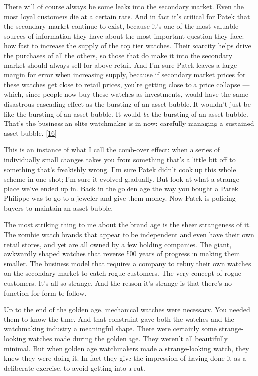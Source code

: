 There will of course always be some leaks into the secondary market.
Even the most loyal customers die at a certain rate. And in fact it's
critical for Patek that the secondary market continue to exist, because
it's one of the most valuable sources of information they have about the
most important question they face: how fast to increase the supply of
the top tier watches. Their scarcity helps drive the purchases of all
the others, so those that do make it into the secondary market should
always sell for above retail. And I'm sure Patek leaves a large margin
for error when increasing supply, because if secondary market prices for
these watches get close to retail prices, you're getting close to a
price collapse --- which, since people now buy these watches as
investments, would have the same disastrous cascading effect as the
bursting of an asset bubble. It wouldn't just be like the bursting of an
asset bubble. It would \emph{be} the bursting of an asset bubble. That's
the business an elite watchmaker is in now: carefully managing a
sustained asset bubble. {[}\hyperref[f16n]{16}{]}

This is an instance of what I call the comb-over effect: when a series
of individually small changes takes you from something that's a little
bit off to something that's freakishly wrong. I'm sure Patek didn't cook
up this whole scheme in one shot; I'm sure it evolved gradually. But
look at what a strange place we've ended up in. Back in the golden age
the way you bought a Patek Philippe was to go to a jeweler and give them
money. Now Patek is policing buyers to maintain an asset bubble.

The most striking thing to me about the brand age is the sheer
strangeness of it. The zombie watch brands that appear to be independent
and even have their own retail stores, and yet are all owned by a few
holding companies. The giant, awkwardly shaped watches that reverse 500
years of progress in making them smaller. The business model that
requires a company to rebuy their own watches on the secondary market to
catch rogue customers. The very concept of rogue customers. It's all so
strange. And the reason it's strange is that there's no function for
form to follow.

Up to the end of the golden age, mechanical watches were necessary. You
needed them to know the time. And that constraint gave both the watches
and the watchmaking industry a meaningful shape. There were certainly
some strange-looking watches made during the golden age. They weren't
all beautifully minimal. But when golden age watchmakers made a
strange-looking watch, they knew they were doing it. In fact they give
the impression of having done it as a deliberate exercise, to avoid
getting into a rut.

